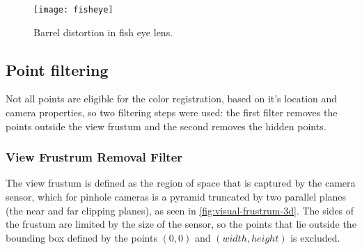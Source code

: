 \begin{figure}[h]
    
    \centering
    \texttt{[image: fisheye]}

    \caption{Barrel distortion in fish eye lens.}
    \label{fig:fisheye}

\end{figure}

\subsection{Point filtering}

Not all points are eligible for the color registration, based on it's location and camera properties, so two filtering steps were used: the first filter removes the points outside the view frustum and the second removes the hidden points.

\subsubsection{View Frustrum Removal Filter}

The view frustum is defined as the region of space that is captured by the camera sensor, which for pinhole cameras is a pyramid truncated by two parallel planes (the near and far clipping planes), as seen in \cref{fig:visual-frustrum-3d}. The sides of the frustum are limited by the size of the sensor, so the points that lie outside the bounding box defined by the points $(0,0)$ and $(width, height)$ is excluded.


